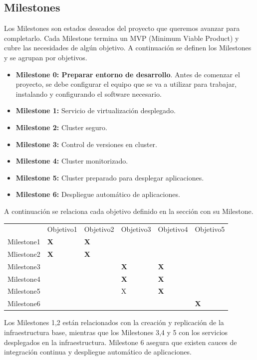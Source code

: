 	\subsection{Milestones}
		\begin{text}
			Los Milestones son estados deseados del proyecto que queremos avanzar para completarlo. Cada Milestone termina un MVP (Minimum Viable Product) y cubre las necesidades de algún objetivo. A continuación se definen los Milestones y se agrupan por objetivos.
			
			\begin{itemize}
				\item \textbf{Milestone 0: Preparar entorno de desarrollo}. Antes de comenzar el proyecto, se debe configurar el equipo que se va a utilizar para trabajar, instalando y configurando el software necesario. 
				\item \textbf{Milestone 1:} Servicio de virtualización desplegado. 
				\item \textbf{Milestone 2:} Cluster seguro.
				\item \textbf{Milestone 3:} Control de versiones en cluster.
				\item \textbf{Milestone 4:} Cluster monitorizado.
				\item \textbf{Milestone 5:} Cluster preparado para desplegar aplicaciones.
				\item \textbf{Milestone 6:} Despliegue automático de aplicaciones.
			\end{itemize}
			A continuación se relaciona cada objetivo definido en la sección  con su Milestone.
			
		
		\begin{table}[!hbt]
			\begin{tabular}{llllll}
				& Objetivo1         & Objetivo2         & Objetivo3         & Objetivo4         & Objetivo5         \\
				Milestone1 & \textbf{X} & \textbf{X} & \textbf{}  &            &            \\
				Mliestone2 & \textbf{X} & \textbf{X} &            &            &            \\
				Milestone3 &            &            & \textbf{X} & \textbf{X} &            \\
				Milestone4 &            &            & \textbf{X} & \textbf{X} &            \\
				Milestone5 &            &            & X          & \textbf{X} &            \\
				Milestone6 &            &            &            &            & \textbf{X}
			\end{tabular}
		\end{table}
	
		Los Milestones 1,2 están relacionados con la creación y replicación de la infraestructura base, mientras que los Milestones 3,4 y 5 con los servicios desplegados en la infraestructura. Milestone 6 asegura que existen cauces de integración continua y despliegue automático de aplicaciones.
			
		\end{text}

